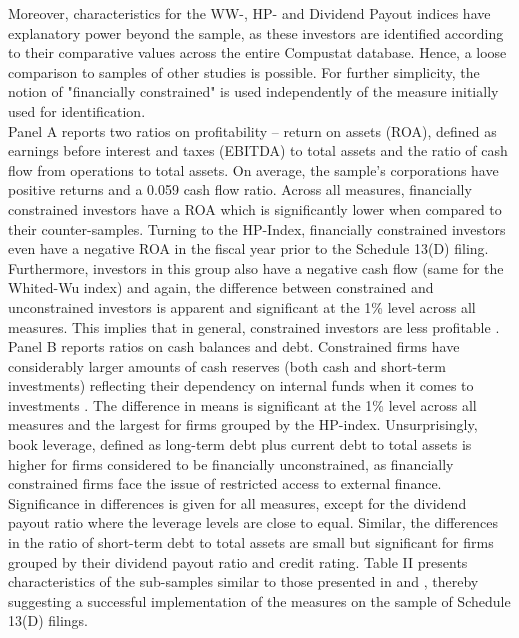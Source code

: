 \documentclass[12pt]{article}
\begin{document}
\pagebreak
\noindent Moreover, characteristics for the WW-, HP- and Dividend Payout indices have explanatory power beyond the sample, as these investors are identified according to their comparative values across the entire Compustat database. 
%
Hence, a loose comparison to samples of other studies is possible. For further simplicity, the notion of "financially constrained" is used independently of the measure initially used for identification. \\
Panel A reports two ratios on profitability -- return on assets (ROA), defined as earnings before interest and taxes (EBITDA) to total assets and the ratio of cash flow from operations to total assets. On average, the sample's corporations have positive returns and a 0.059 cash flow ratio. Across all measures, financially constrained investors have a ROA which is significantly lower when compared to their counter-samples. Turning to the HP-Index, financially constrained investors even have a negative ROA in the fiscal year prior to the Schedule 13(D) filing. Furthermore, investors in this group also have a negative cash flow (same for the Whited-Wu index) and again, the difference between constrained and unconstrained investors is apparent and significant at the 1\% level across all measures. This implies that in general, constrained investors are less profitable \citep[p.544]{Whited2006}.\\
Panel B reports ratios on cash balances and debt. Constrained firms have considerably larger amounts of cash reserves (both cash and short-term investments) reflecting their dependency on internal funds when it comes to investments \citep[p.142]{Fazzari1988}. The difference in means is significant at the 1\% level across all measures and the largest for firms grouped by the HP-index. Unsurprisingly, book leverage, defined as long-term debt plus current debt to total assets \citep[p.1440]{MacKay2005} is higher for firms considered to be financially unconstrained, as financially constrained firms face the issue of restricted access to external finance. Significance in differences is given for all measures, except for the dividend payout ratio where the leverage levels are close to equal. Similar, the differences in the ratio of short-term debt to total assets are small but significant for firms grouped by their dividend payout ratio and credit rating. Table II presents characteristics of the sub-samples similar to those presented in \citet[p.544]{Whited2006} and \citet[p.1917]{hadlock2010}, thereby suggesting a successful implementation of the measures on the sample of Schedule 13(D) filings.
\end{document}

